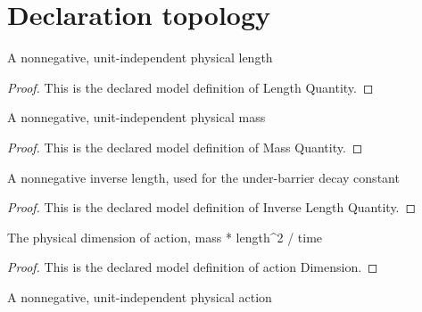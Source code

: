 \section{Declaration topology}
\begin{definition}
  \label{def:physics:phyx-mini-0533:phyxminiproblems-problemphyxmini0533-lengthquantity}
  A nonnegative, unit-independent physical length
\end{definition}
\begin{proof}
  This is the declared model definition of Length Quantity.
\end{proof}
\begin{definition}
  \label{def:physics:phyx-mini-0533:phyxminiproblems-problemphyxmini0533-massquantity}
  A nonnegative, unit-independent physical mass
\end{definition}
\begin{proof}
  This is the declared model definition of Mass Quantity.
\end{proof}
\begin{definition}
  \label{def:physics:phyx-mini-0533:phyxminiproblems-problemphyxmini0533-inverselengthquantity}
  A nonnegative inverse length, used for the under-barrier decay constant
\end{definition}
\begin{proof}
  This is the declared model definition of Inverse Length Quantity.
\end{proof}
\begin{definition}
  \label{def:physics:phyx-mini-0533:phyxminiproblems-problemphyxmini0533-actiondimension}
  The physical dimension of action, mass * length\textasciicircum{}2 / time
\end{definition}
\begin{proof}
  This is the declared model definition of action Dimension.
\end{proof}
\begin{definition}
  \label{def:physics:phyx-mini-0533:phyxminiproblems-problemphyxmini0533-actionquantity}
  A nonnegative, unit-independent physical action
\end{definition}
